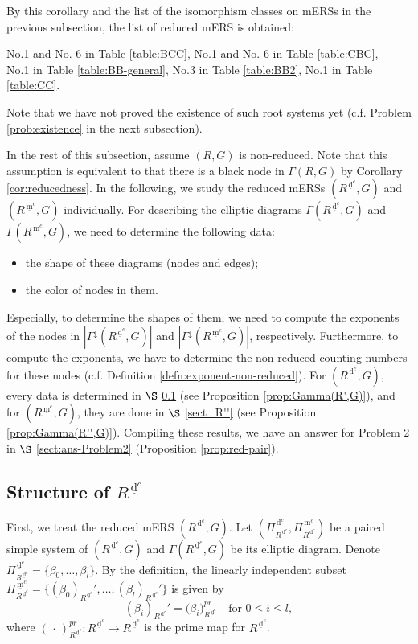 \documentclass[11pt]{amsart}
\newcommand{\dc}{\,\underline{\mathrm{d}}^c}
\newcommand{\mc}{\, \underline{\mathrm{m}}^c}
\begin{document}
{By this corollary and the list of the isomorphism classes on mERSs 
in the previous subsection, the list of reduced mERS is obtained:
\begin{center}
No.1 and No. 6 in Table \ref{table:BCC}, \quad 
No.1 and No. 6 in Table \ref{table:CBC},\\[3pt]
No.1 in Table \ref{table:BB-general}, \quad  No.3 in Table \ref{table:BB2},\quad
No.1 in Table \ref{table:CC}.
\end{center}
Note that we have not proved the existence of such root systems yet (c.f. 
Problem \ref{prob:existence} in the next subsection).

In the rest of this subsection, assume $(R,G)$ is non-reduced. 
Note that this assumption is equivalent to  that
there is a black node in $\Gamma(R,G)$ by Corollary \ref{cor:reducedness}.
In the following, we study the reduced mERSs 
$(R^{\dc},G)$ and $(R^{\mc},G)$ individually. 
For describing the elliptic diagrams
$\Gamma(R^{\dc},G)$ and $\Gamma(R^{\mc},G)$, we need to determine
the following data: 
\begin{itemize}
\item the shape of these diagrams (nodes and edges);
\vskip 1mm
\item the color of nodes in them.
\end{itemize}
Especially, to determine the shapes of them, we need to compute the exponents 
of the nodes in 
$|\Gamma^{\downarrow}(R^{\dc},G)|$ and $|\Gamma^{\downarrow}(R^{\mc},G)|$, 
respectively. Furthermore, to compute the exponents, we have to determine 
the non-reduced counting numbers for these nodes 
(c.f. Definition \ref{defn:exponent-non-reduced}). 
For $(R^{\dc},G)$, every data is determined in $\S$ \ref{sect_R'}
(see {Proposition} \ref{prop:Gamma(R',G)}), and for $(R^{\mc},G)$, 
they are done in $\S$ \ref{sect_R''} (see Proposition \ref{prop:Gamma(R'',G)}). 
Compiling these results, we have an answer for Problem 2 in  
$\S$ \ref{sect:ans-Problem2} (Proposition \ref{prop:red-pair}). 
\vskip 5mm

\subsection{ Structure of $R^{\dc}$}\label{sect_R'}
First, we treat the reduced mERS $(R^{\dc},G)$. 
Let $(\Pi_{R^{\dc}}^{\dc},\Pi_{R^{\dc}}^{\mc})$ be a paired simple system of 
$(R^{\dc},G)$ and $\Gamma(R^{\dc},G)$ be its elliptic diagram.
Denote $\Pi_{R^{\dc}}^{\dc}=\{\beta_0,\ldots,\beta_l\}$. 
By the definition, the linearly independent subset 
$\Pi_{R^{\dc}}^{\mc}=\big\{(\beta_0)_{R^{\dc}}',\ldots,
(\beta_l)_{R^{\dc}}'\big\}$ is given by
\[(\beta_i)_{R^{\dc}}'=\big(\beta_i\big)^{pr}_{R^{\dc}}
\quad \text{for }0\leq i\leq l,\]
where $(\,\cdot\,)^{pr}_{R^{\dc}}:R^{\dc}\to R^{\dc}$ is the prime map for $R^{\dc}$. 

}
\end{document}
